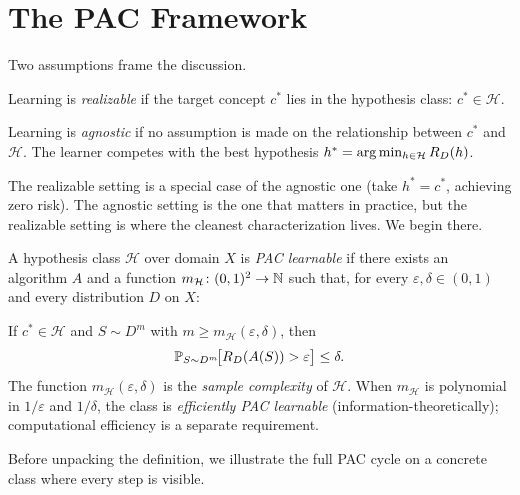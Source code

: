 
\section{The PAC Framework}
\label{sec:pac-def}

Two assumptions frame the discussion.

\begin{defn}
\label{def:realizable}
Learning is \emph{realizable} if the target concept $c^*$ lies in the
hypothesis class: $c^* \in \mathcal{H}$.
\end{defn}

\begin{defn}
\label{def:agnostic}
Learning is \emph{agnostic} if no assumption is made on the relationship between
$c^*$ and $\mathcal{H}$.  The learner competes with the best hypothesis
$h^* = \arg\min_{h \in \mathcal{H}} R_D(h)$.
\end{defn}

The realizable setting is a special case of the agnostic one (take
$h^* = c^*$, achieving zero risk).  The agnostic setting is the one that
matters in practice, but the realizable setting is where the cleanest
characterization lives.  We begin there.

\begin{defn}
\label{def:pac}
A hypothesis class $\mathcal{H}$ over domain $X$ is \emph{PAC learnable} if
there exists an algorithm $A$ and a function $m_\mathcal{H} \colon
(0,1)^2 \to \mathbb{N}$ such that, for every $\varepsilon, \delta \in (0,1)$ and every
distribution $D$ on $X$:

If $c^* \in \mathcal{H}$ and $S \sim D^m$ with $m \geq
m_\mathcal{H}(\varepsilon, \delta)$, then
\[
  \mathbb{P}_{S \sim D^m}\!\bigl[R_D(A(S)) > \varepsilon\bigr] \leq \delta.
\]
The function $m_\mathcal{H}(\varepsilon, \delta)$ is the \emph{sample
complexity} of $\mathcal{H}$.  When $m_\mathcal{H}$ is polynomial in
$1/\varepsilon$ and $1/\delta$, the class is \emph{efficiently PAC learnable}
(information-theoretically); computational efficiency is a separate
requirement.
\end{defn}

Before unpacking the definition, we illustrate the full PAC cycle on a
concrete class where every step is visible.

